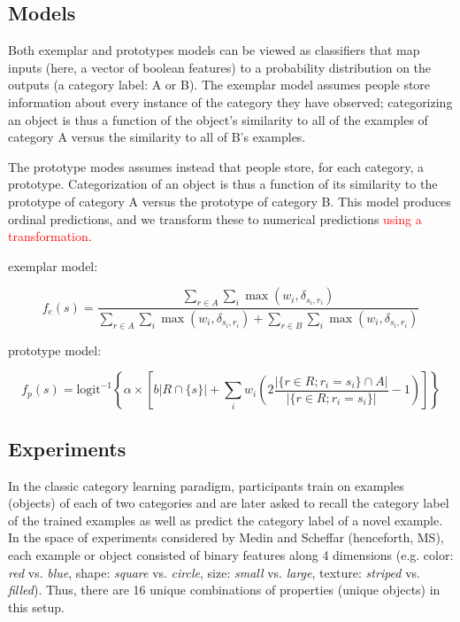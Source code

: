 \documentclass{article}
\newcommand{\red}[1]{\textcolor{Red}{#1}}
\begin{document}
\subsection{Models}

Both exemplar and prototypes models can be viewed as classifiers that map inputs (here, a vector of boolean features) to a probability distribution on the outputs (a category label: A or B).
The exemplar model assumes people store information about every instance of the category they have observed; categorizing an object is thus a function of the object's similarity to all of the examples of category A versus the similarity to all of B's examples.

The prototype modes assumes instead that people store, for each category, a prototype. Categorization of an object is thus a function of its similarity to the prototype of category A versus the prototype of category B.
This model produces ordinal predictions, and we transform these to numerical predictions \red{using a transformation}.

exemplar model:

$$ f_e(s) = \frac{ \sum\limits_{r \in A}{\sum\limits_{i}\max (w_i, \delta_{s_i, r_i})} }{
  \sum\limits_{r \in A}{\sum\limits_{i}\max (w_i, \delta_{s_i, r_i} )} + \sum\limits_{r \in B}{\sum\limits_{i}\max (w_i, \delta_{s_i, r_i})}
} $$

prototype model:

$$ f_p(s) = \mathrm{logit}^{-1}\left\{ \alpha \times \left[ b|R \cap \{s\}| + \sum\limits_{i}w_i \left(2\frac{|\{r \in R ; r_i = s_i \} \cap A |}{|\{r \in R ; r_i = s_i \}|} - 1\right) \right] \right\} $$


\subsection{Experiments}

In the classic category learning paradigm, participants train on examples (objects) of each of two categories and are later asked to recall the category label of the trained examples as well as predict the category label of a novel example.
In the space of experiments considered by Medin and Scheffar (henceforth, MS), each example or object consisted of binary features along 4 dimensions (e.g. color: \emph{red} vs. \emph{blue}, shape: \emph{square} vs. \emph{circle}, size: \emph{small} vs. \emph{large}, texture: \emph{striped} vs. \emph{filled}).
Thus, there are 16 unique combinations of properties (unique objects) in this setup.
\end{document}
